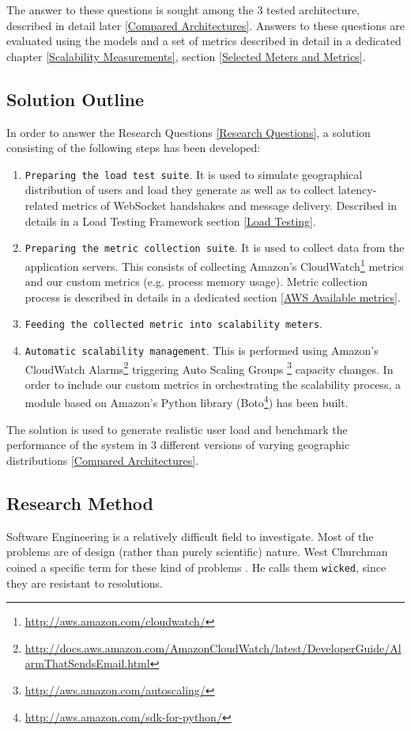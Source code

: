 \documentclass{uvamscse}
\begin{document}
The answer to these questions is sought among the 3 tested architecture, described in detail later \ref{Compared Architectures}. Answers to these questions are evaluated using the models and a set of metrics described in detail in a dedicated chapter \ref{Scalability Measurements}, section \ref{Selected Meters and Metrics}.

\subsection{Solution Outline}

In order to answer the Research Questions \ref{Research Questions}, a solution consisting of the following steps has been developed:
\begin{enumerate}
  \item \texttt{Preparing the load test suite}. It is used to simulate geographical distribution of users and load they generate as well as to collect latency-related metrics of WebSocket handshakes and message delivery. Described in details in a Load Testing Framework section \ref{Load Testing}.
  \item \texttt{Preparing the metric collection suite}. It is used to collect data from the application servers. This consists of collecting Amazon's CloudWatch\footnote{\url{http://aws.amazon.com/cloudwatch/}} metrics and our custom metrics (e.g. process memory usage). Metric collection process is described in details in a dedicated section \ref{AWS Available metrics}.
  \item \texttt{Feeding the collected metric into scalability meters}.
  \item \texttt{Automatic scalability management}. This is performed using Amazon's CloudWatch Alarms\footnote{\url{http://docs.aws.amazon.com/AmazonCloudWatch/latest/DeveloperGuide/AlarmThatSendsEmail.html}} triggering Auto Scaling Groups \footnote{\url{http://aws.amazon.com/autoscaling/}} capacity changes. In order to include our custom metrics in orchestrating the scalability process, a module based on Amazon's Python library (Boto\footnote{\url{http://aws.amazon.com/sdk-for-python/}}) has been built.
\end{enumerate}

The solution is used to generate realistic user load and benchmark the performance of the system in 3 different versions of varying geographic distributions \ref{Compared Architectures}.

\subsection{Research Method}\label{Research Method}
Software Engineering is a relatively difficult field to investigate. Most of the problems are of design (rather than purely scientific) nature. West Churchman coined a specific term for these kind of problems \cite{Wckd}. He calls them \texttt{wicked}, since they are resistant to resolutions.
\end{document}
